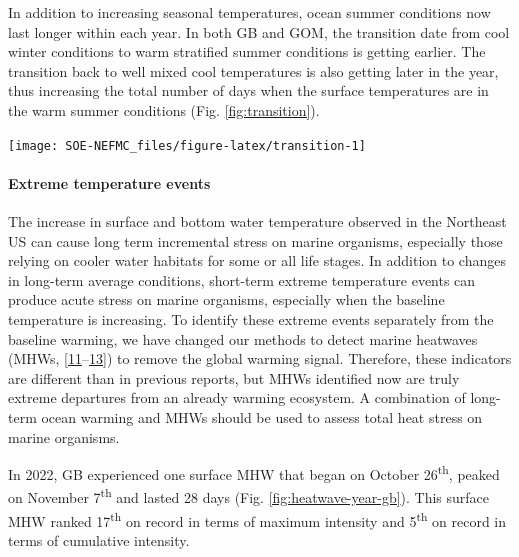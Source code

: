 \documentclass[
  10pt,
]{article}
\let\origfigure\figure
\let\endorigfigure\endfigure
\renewenvironment{figure}[1][2] {
    \expandafter\origfigure\expandafter[H]
} {
    \endorigfigure
}
\begin{document}
In addition to increasing seasonal temperatures, ocean summer conditions now last longer within each year. In both GB and GOM, the transition date from cool winter conditions to warm stratified summer conditions is getting earlier. The transition back to well mixed cool temperatures is also getting later in the year, thus increasing the total number of days when the surface temperatures are in the warm summer conditions (Fig. \ref{fig:transition}).

\begin{figure}

{\centering \texttt{[image: SOE-NEFMC\_files/figure-latex/transition-1]} 

}

\caption{Ocean summer length in New England: the annual total number of days between the spring thermal transition date and the fall thermal transition date.  The transition dates are defined as the day of the year when surface temperatures changeover from cool to warm conditions in the spring and back to cool conditions in the fall. The left is Georges Bank (GB) and the right is Gulf of Maine (GOM).}\label{fig:transition}
\end{figure}

\hypertarget{extreme-temperature-events}{%
\paragraph{Extreme temperature events}\label{extreme-temperature-events}}

The increase in surface and bottom water temperature observed in the Northeast US can cause long term incremental stress on marine organisms, especially those relying on cooler water habitats for some or all life stages. In addition to changes in long-term average conditions, short-term extreme temperature events can produce acute stress on marine organisms, especially when the baseline temperature is increasing. To identify these extreme events separately from the baseline warming, we have changed our methods to detect marine heatwaves (MHWs, {[}\protect\hyperlink{ref-hobday_hierarchical_2016}{11}--\protect\hyperlink{ref-jacox_global_2022}{13}{]}) to remove the global warming signal. Therefore, these indicators are different than in previous reports, but MHWs identified now are truly extreme departures from an already warming ecosystem. A combination of long-term ocean warming and MHWs should be used to assess total heat stress on marine organisms.

In 2022, GB experienced one surface MHW that began on October 26\textsuperscript{th}, peaked on November 7\textsuperscript{th} and lasted 28 days (Fig. \ref{fig:heatwave-year-gb}). This surface MHW ranked 17\textsuperscript{th} on record in terms of maximum intensity and 5\textsuperscript{th} on record in terms of cumulative intensity.
\end{document}
